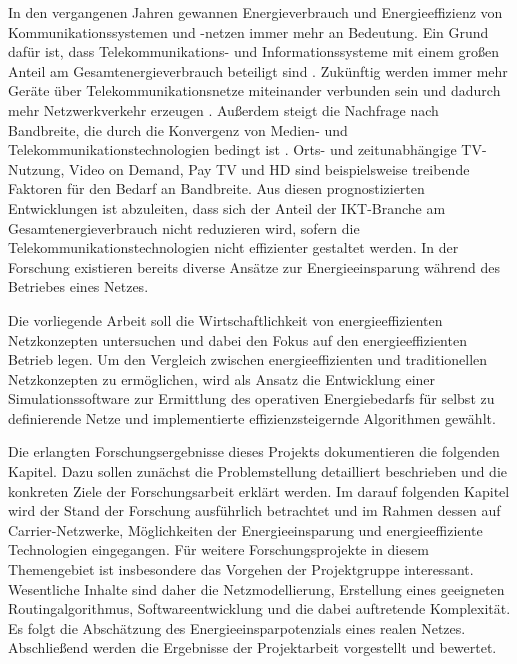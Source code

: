 In den vergangenen Jahren gewannen Energieverbrauch und Energieeffizienz von Kommunikationssystemen und -netzen immer mehr an Bedeutung. Ein Grund dafür ist, dass Telekommunikations- und Informationssysteme mit einem großen Anteil am Gesamtenergieverbrauch beteiligt sind \cite{fraunhofer:energiebedarf}. Zukünftig werden immer mehr Geräte über Telekommunikationsnetze miteinander verbunden sein und dadurch mehr Netzwerkverkehr erzeugen \cite{cisco}.  Außerdem steigt die Nachfrage nach Bandbreite, die durch die Konvergenz von Medien- und Telekommunikationstechnologien bedingt ist \cite{anga}.  Orts- und zeitunabhängige TV-Nutzung, Video on Demand, Pay TV und HD sind beispielsweise treibende Faktoren für den Bedarf an Bandbreite. Aus diesen prognostizierten Entwicklungen ist abzuleiten, dass sich der Anteil der IKT-Branche am Gesamtenergieverbrauch nicht reduzieren wird, sofern die Telekommunikationstechnologien nicht effizienter gestaltet werden. In der Forschung existieren bereits diverse Ansätze zur Energieeinsparung während des Betriebes eines Netzes.


Die vorliegende Arbeit soll die Wirtschaftlichkeit von energieeffizienten Netzkonzepten untersuchen und dabei den Fokus auf den energieeffizienten Betrieb legen. Um den Vergleich zwischen energieeffizienten und traditionellen Netzkonzepten zu ermöglichen, wird als Ansatz die Entwicklung einer Simulationssoftware zur Ermittlung des operativen Energiebedarfs für  selbst zu definierende Netze und implementierte effizienzsteigernde Algorithmen gewählt.


Die erlangten Forschungsergebnisse dieses Projekts dokumentieren die folgenden Kapitel. Dazu sollen zunächst die Problemstellung detailliert beschrieben und die konkreten Ziele der Forschungsarbeit erklärt werden. Im darauf folgenden Kapitel wird der Stand der Forschung ausführlich betrachtet und im Rahmen dessen auf Carrier-Netzwerke, Möglichkeiten der Energieeinsparung und energieeffiziente Technologien eingegangen. Für weitere Forschungsprojekte in diesem Themengebiet ist insbesondere das Vorgehen der Projektgruppe interessant. Wesentliche Inhalte sind daher die Netzmodellierung, Erstellung eines geeigneten Routingalgorithmus, Softwareentwicklung und die dabei auftretende Komplexität. Es folgt die Abschätzung des Energieeinsparpotenzials eines realen Netzes. Abschließend werden die Ergebnisse der Projektarbeit vorgestellt und bewertet. 
